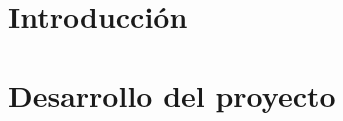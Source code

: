\documentclass[12pt,a4paper]{book}
\begin{document}
\frontmatter











\mainmatter



\part{Introducción}



\part{Desarrollo del proyecto}


\end{document}
